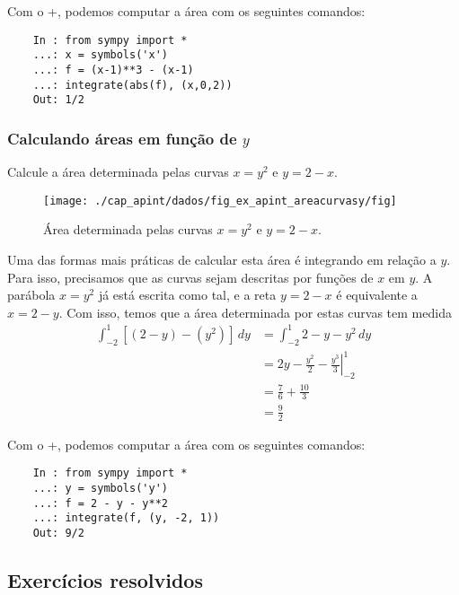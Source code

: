 \begin{ex}
  \ifispython
  Com o {\python}+{\sympy}, podemos computar a área com os seguintes comandos:
  \begin{lstlisting}
    In : from sympy import *
    ...: x = symbols('x')
    ...: f = (x-1)**3 - (x-1)
    ...: integrate(abs(f), (x,0,2))
    Out: 1/2
  \end{lstlisting}
  \fi  
\end{ex}

\subsubsection{Calculando áreas em função de $y$}

\begin{ex}
  Calcule a área determinada pelas curvas $x = y^2$ e $y = 2 - x$.

  \begin{figure}[H]
    \centering
    \texttt{[image: ./cap\_apint/dados/fig\_ex\_apint\_areacurvasy/fig]}
    \caption{Área determinada pelas curvas $x = y^2$ e $y = 2 - x$.}
    \label{fig:ex_apint_areacurvasy}
  \end{figure}

  Uma das formas mais práticas de calcular esta área é integrando em relação a $y$. Para isso, precisamos que as curvas sejam descritas por funções de $x$ em $y$. A parábola $x = y^2$ já está escrita como tal, e a reta $y = 2 - x$ é equivalente a $x = 2 - y$. Com isso, temos que a área determinada por estas curvas tem medida
  \begin{align}
    \int_{-2}^1 \left[(2-y) - (y^2)\right]\,dy &= \int_{-2}^1 2-y-y^2\,dy\\
                                               &= \left. 2y-\frac{y^2}{2}-\frac{y^3}{3}\right|_{-2}^1\\
                                               &= \frac{7}{6} + \frac{10}{3}\\
                                               &=\frac{9}{2}
  \end{align}
  
  \ifispython
  Com o {\python}+{\sympy}, podemos computar a área com os seguintes comandos:
  \begin{lstlisting}
    In : from sympy import *
    ...: y = symbols('y')
    ...: f = 2 - y - y**2
    ...: integrate(f, (y, -2, 1))
    Out: 9/2
  \end{lstlisting}
  \fi  
\end{ex}

\subsection{Exercícios resolvidos}

